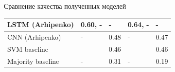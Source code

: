 \documentclass{beamer}
\begin{document}
\begin{frame}{Сравнение качества полученных моделей}
\begin{table}[]
{\begin{tabular}{l|l|l|l|l|}
\multicolumn{1}{|l|}{LSTM (Arhipenko)}                                                                        & 0.60, -               & -    & 0.64, -                                              & -                                   \\ \hline
\multicolumn{1}{|l|}{CNN (Arhipenko)}                                                                         & -                     & 0.48 & -                                                    & 0.47                                \\ \hline
\multicolumn{1}{|l|}{SVM baseline}                                                                            & -                     & 0.46 & -                                                    & 0.46                                \\ \hline
\multicolumn{1}{|l|}{Majority baseline}                                                                       & -                     & 0.31 & -                                                    & 0.19                                \\ \hline
\end{tabular}
}
\end{table}

\end{frame}
\end{document}
